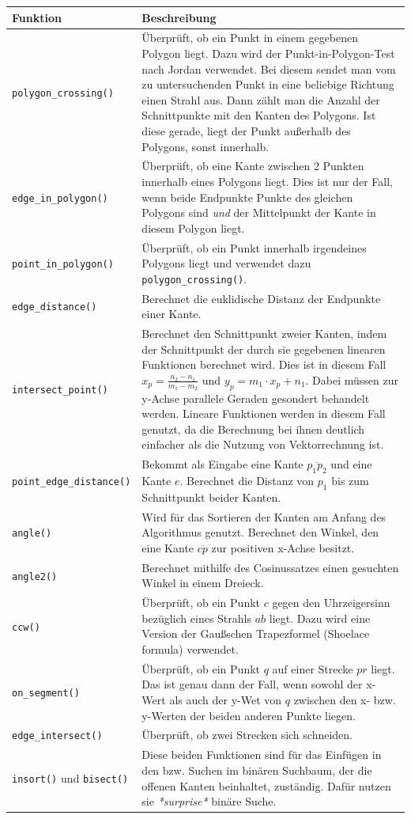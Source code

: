 \documentclass[a4paper, notitlepage, 12pt]{scrartcl}
\begin{document}
\begin{longtabu} to \linewidth {lX}
	Funktion & Beschreibung \\ \hline \hline \endhead
	\texttt{polygon\_crossing()} & Überprüft, ob ein Punkt in einem gegebenen Polygon liegt. Dazu wird der Punkt-in-Polygon-Test nach Jordan verwendet. Bei diesem sendet man vom zu untersuchenden Punkt in eine beliebige Richtung einen Strahl aus. Dann zählt man die Anzahl der Schnittpunkte mit den Kanten des Polygons. Ist diese gerade, liegt der Punkt außerhalb des Polygons, sonst innerhalb. \\ \hline
	\texttt{edge\_in\_polygon()} & Überprüft, ob eine Kante zwischen 2 Punkten innerhalb eines Polygons liegt. Dies ist nur der Fall, wenn beide Endpunkte Punkte des gleichen Polygons sind \textit{und} der Mittelpunkt der Kante in diesem Polygon liegt. \\ \hline
	\texttt{point\_in\_polygon()} & Überprüft, ob ein Punkt innerhalb irgendeines Polygons liegt und verwendet dazu \texttt{polygon\_crossing()}.\\ \hline
	\texttt{edge\_distance()} &  Berechnet die euklidische Distanz der Endpunkte einer Kante.\\ \hline
	\texttt{intersect\_point()} & Berechnet den Schnittpunkt zweier Kanten, indem der Schnittpunkt der durch sie gegebenen linearen Funktionen berechnet wird. Dies ist in diesem Fall $x_p = \frac{n_2 - n_1}{m_1 - m_2}$ und $y_p = m_1 \cdot x_p + n_1$. Dabei müssen zur y-Achse parallele Geraden gesondert behandelt werden. Lineare Funktionen werden in diesem Fall genutzt, da die Berechnung bei ihnen deutlich einfacher als die Nutzung von Vektorrechnung ist.\\ \hline
	\texttt{point\_edge\_distance()} & Bekommt als Eingabe eine Kante $\overline{p_1p_2}$ und eine Kante $e$. Berechnet die Distanz von $p_1$ bis zum Schnittpunkt beider Kanten.\\ \hline
	\texttt{angle()} & Wird für das Sortieren der Kanten am Anfang des Algorithmus genutzt. Berechnet den Winkel, den eine Kante $\overline{cp}$ zur positiven x-Achse besitzt.\\ \hline
	\texttt{angle2()} & Berechnet mithilfe des Cosinussatzes einen gesuchten Winkel in einem Dreieck.\\ \hline
	\texttt{ccw()} & Überprüft, ob ein Punkt $c$ gegen den Uhrzeigersinn bezüglich eines Strahls $ab$ liegt. Dazu wird eine Version der Gaußschen Trapezformel (Shoelace formula) verwendet.\\ \hline
	\texttt{on\_segment()} & Überprüft, ob ein Punkt $q$ auf einer Strecke $pr$ liegt. Das ist genau dann der Fall, wenn sowohl der x-Wert als auch der y-Wet von $q$ zwischen den x- bzw. y-Werten der beiden anderen Punkte liegen.\\ \hline
	\texttt{edge\_intersect()} & Überprüft, ob zwei Strecken sich schneiden. \\ \hline
	\texttt{insort()} und \texttt{bisect()} & Diese beiden Funktionen sind für das Einfügen in den bzw. Suchen im binären Suchbaum, der die offenen Kanten beinhaltet, zuständig. Dafür nutzen sie \textit{*surprise*} binäre Suche.	\\
\end{longtabu}
\end{document}
